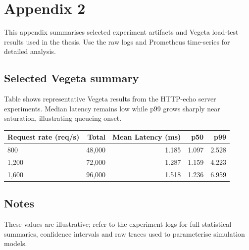 \chapter{Appendix 2}\label{app2}


This appendix summarises selected experiment artifacts and Vegeta
load-test results used in the thesis.  Use the raw logs and Prometheus
time-series for detailed analysis.

\section{Selected Vegeta summary}
Table shows representative Vegeta results from the HTTP-echo server
experiments. Median latency remains low while p99 grows sharply near
saturation, illustrating queueing onset.

\begin{tabular}{lrrrr}
\hline
Request rate (req/s) & Total & Mean Latency (ms) & p50 & p99 \\
\hline
800  & 48,000 & 1.185 & 1.097 & 2.528 \\
1,200 & 72,000 & 1.287 & 1.159 & 4.223 \\
1,600 & 96,000 & 1.518 & 1.236 & 6.959 \\
\hline
\end{tabular}

\section{Notes}
These values are illustrative; refer to the experiment logs for full
statistical summaries, confidence intervals and raw traces used to
parameterise simulation models.
